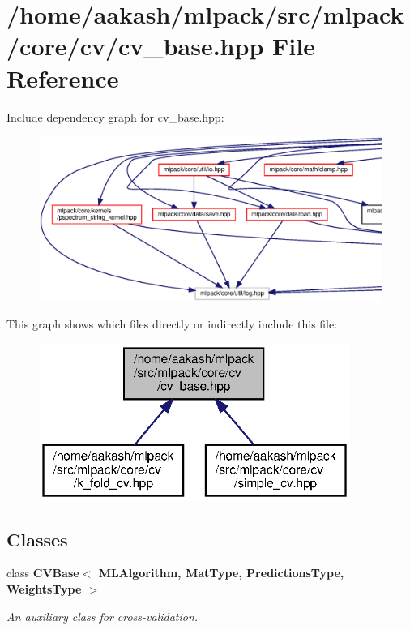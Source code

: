 \section{/home/aakash/mlpack/src/mlpack/core/cv/cv\+\_\+base.hpp File Reference}
\label{cv__base_8hpp}
Include dependency graph for cv\+\_\+base.\+hpp\+:
\nopagebreak
\begin{figure}[H]
\begin{center}
\leavevmode
\includegraphics[width=350pt]{cv__base_8hpp__incl}
\end{center}
\end{figure}
This graph shows which files directly or indirectly include this file\+:
\nopagebreak
\begin{figure}[H]
\begin{center}
\leavevmode
\includegraphics[width=288pt]{cv__base_8hpp__dep__incl}
\end{center}
\end{figure}
\subsection*{Classes}
\begin{DoxyCompactItemize}
\item 
class \textbf{ C\+V\+Base$<$ M\+L\+Algorithm, Mat\+Type, Predictions\+Type, Weights\+Type $>$}
\begin{DoxyCompactList}\small\item\em An auxiliary class for cross-\/validation. \end{DoxyCompactList}\end{DoxyCompactItemize}

